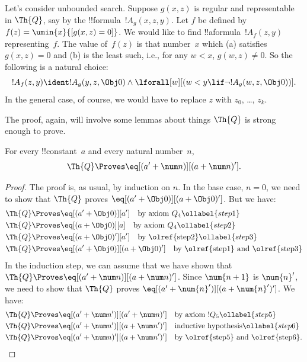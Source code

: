 \documentclass[../../../include/open-logic-section]{subfiles}
\begin{document}

Let's consider unbounded search. Suppose $g(x, z)$ is regular and
representable in $\Th{Q}$, say by the !!{formula}~$!A_g(x, z, y)$. Let
$f$ be defined by $f(z) = \umin{x}{[g(x, z) = 0]}$. We would like to find
!!a{formula}~$!A_f(z, y)$ representing~$f$.  The value of~$f(z)$ is
that number~$x$ which (a) satisfies $g(x, z) = 0$ and (b) is the least
such, i.e., for any $w < x$, $g(w, z) \neq 0$.  So the following is a
natural choice:
\[
!A_f(z,y) \ident !A_g(y, z, \Obj 0) \land \lforall[w][(w < y \lif \lnot
  !A_g(w, z, \Obj 0))].
\]
In the general case, of course, we would have to replace $z$ with
$z_0$, \dots, $z_k$.

The proof, again, will involve some lemmas about things $\Th{Q}$ is
strong enough to prove.

\begin{lem}
 For every !!{constant}~$a$ and every natural
number~$n$,
\[
\Th{Q} \Proves \eq[(a' + \num n)][(a + \num n)'].
\]
\end{lem}

\begin{proof}
The proof is, as usual, by induction on $n$. In the base case, $n =
0$, we need to show that $\Th{Q}$ proves $\eq[(a' + \Obj 0)][(a + \Obj
0)']$. But we have:
\begin{align}
  \Th{Q} & \Proves \eq[(a' + \Obj 0)][a'] \quad \text{by axiom $Q_4$}
  \ollabel{step1}\\
  \Th{Q} & \Proves  \eq[(a + \Obj 0)][a] \quad \text{by axiom $Q_4$}
  \ollabel{step2} \\
  \Th{Q} & \Proves \eq[(a + \Obj 0)'][a'] \quad \text{by \olref{step2}}
  \ollabel{step3} \\
  \Th{Q} & \Proves \eq[(a' + \Obj 0)][(a + \Obj 0)'] \quad
  \text{by \olref{step1} and \olref{step3}}\notag
\end{align}
In the induction step, we can assume that we have shown that $\Th{Q}
\Proves \eq[(a' + \num n)][(a + \num n)']$. Since
$\num{n+1}$ is $\num{n}'$, we need to show that $\Th{Q}$ proves
$\eq[(a' + \num{n}')][(a + \num{n}')']$. We have:
\begin{align}
  \Th{Q} & \Proves \eq[(a' + \num n')][(a' + \num n)'] \quad
  \text{by axiom $!Q_5$} \ollabel{step5}\\
  \Th{Q} & \Proves \eq[(a' + \num n')][(a + \num n')'] \quad
  \text{inductive hypothesis} \ollabel{step6}\\
  \Th{Q} & \Proves \eq[(a' + \num n)'][(a + \num n')'] \quad
  \text{by \olref{step5} and \olref{step6}.} \notag
\end{align}
\end{proof}
\end{document}
